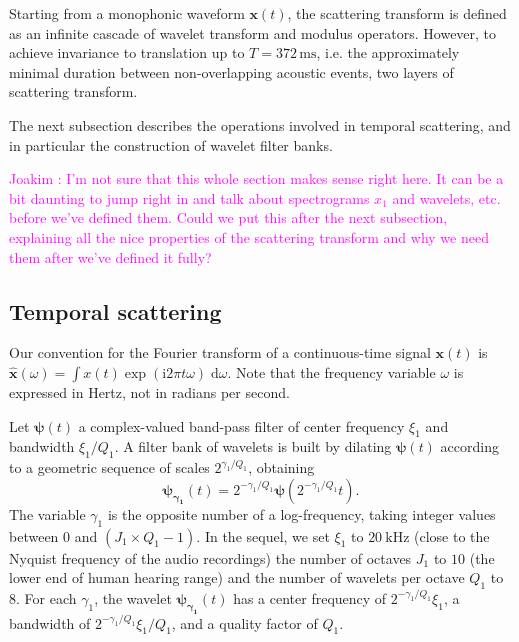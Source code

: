 \documentclass[journal]{IEEEtran}
\makeatletter
\newcommand*{\ie}{i.e.\@\xspace}
\newcommand{\ja}[1]{\textcolor{magenta}{Joakim : #1}}
\makeatother
\begin{document}
Starting from a monophonic waveform $\boldsymbol{x}(t)$, the scattering transform is defined as an infinite cascade of wavelet transform and modulus operators.
However, to achieve invariance to translation up to $T = 372\,\mathrm{ms}$, \ie the approximately minimal duration between non-overlapping acoustic events, two layers of scattering transform.

The next subsection describes the operations involved in temporal scattering, and in particular the construction of wavelet filter banks.

\ja{I'm not sure that this whole section makes sense right here. It can be a bit daunting to jump right in and talk about spectrograms $x_1$ and wavelets, etc. before we've defined them. Could we put this after the next subsection, explaining all the nice properties of the scattering transform and why we need them after we've defined it fully?}

\subsection{Temporal scattering}
Our convention for the Fourier transform of a continuous-time signal $\boldsymbol{x}(t)$ is $\boldsymbol{\hat{x}}(\omega) = \int x(t) \exp(\mathrm{i} 2\pi t \omega) \; \mathrm{d}\omega$. Note that the frequency variable $\omega$ is expressed in Hertz, not in radians per second.

Let $\boldsymbol{\psi}(t)$ a complex-valued band-pass filter of
center frequency $\xi_1$ and bandwidth $\xi_1/Q_1$.
A filter bank of wavelets is built by dilating $\boldsymbol{\psi}(t)$
according to a geometric sequence of scales $2^{\gamma_1/Q_1}$, obtaining
\begin{equation}
\boldsymbol{\psi_{\gamma_1}}(t) = 2^{-\gamma_1/Q_1} \boldsymbol{\psi}(2^{-\gamma_1/Q_1} t)\mbox{.}
\end{equation}
The variable $\gamma_1$ is the opposite number of a log-frequency, taking integer values between $0$ and $(J_1 \times Q_1 - 1)$.
In the sequel, we set $\xi_1$ to $20~\mathrm{kHz}$ (close to the Nyquist frequency of the audio recordings) the number of octaves $J_1$ to $10$ (the lower end of human hearing range) and the number of wavelets per octave $Q_1$ to $8$.
For each $\gamma_1$, the wavelet $\boldsymbol{\psi_{\gamma_1}}(t)$
has a center frequency of $2^{-\gamma_1/Q_1}\xi_1$, a bandwidth of $2^{-\gamma_1/Q_1}\xi_1/Q_1$, and a quality factor of $Q_1$.
\end{document}
